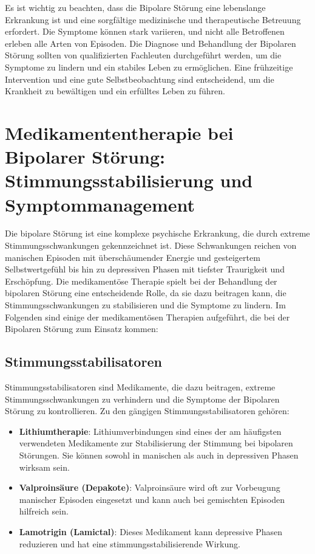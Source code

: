 Es ist wichtig zu beachten, dass die Bipolare Störung eine lebenslange Erkrankung ist und eine sorgfältige medizinische und therapeutische Betreuung erfordert. Die Symptome können stark variieren, und nicht alle Betroffenen erleben alle Arten von Episoden. Die Diagnose und Behandlung der Bipolaren Störung sollten von qualifizierten Fachleuten durchgeführt werden, um die Symptome zu lindern und ein stabiles Leben zu ermöglichen. Eine frühzeitige Intervention und eine gute Selbstbeobachtung sind entscheidend, um die Krankheit zu bewältigen und ein erfülltes Leben zu führen.
%
\section{Medikamententherapie bei Bipolarer Störung: Stimmungsstabilisierung und Symptommanagement}

Die bipolare Störung ist eine komplexe psychische Erkrankung, die durch extreme Stimmungsschwankungen gekennzeichnet ist. Diese Schwankungen reichen von manischen Episoden mit überschäumender Energie und gesteigertem Selbstwertgefühl bis hin zu depressiven Phasen mit tiefster Traurigkeit und Erschöpfung. Die medikamentöse Therapie spielt bei der Behandlung der bipolaren Störung eine entscheidende Rolle, da sie dazu beitragen kann, die Stimmungsschwankungen zu stabilisieren und die Symptome zu lindern. Im Folgenden sind einige der medikamentösen Therapien aufgeführt, die bei der Bipolaren Störung zum Einsatz kommen:

\subsection{Stimmungsstabilisatoren}

Stimmungsstabilisatoren sind Medikamente, die dazu beitragen, extreme Stimmungsschwankungen zu verhindern und die Symptome der Bipolaren Störung zu kontrollieren. Zu den gängigen Stimmungsstabilisatoren gehören:

\begin{itemize}
\item \textbf{Lithiumtherapie}: Lithiumverbindungen sind eines der am häufigsten verwendeten Medikamente zur Stabilisierung der Stimmung bei bipolaren Störungen. Sie können sowohl in manischen als auch in depressiven Phasen wirksam sein.

\item \textbf{Valproinsäure (Depakote)}: Valproinsäure wird oft zur Vorbeugung manischer Episoden eingesetzt und kann auch bei gemischten Episoden hilfreich sein.

\item \textbf{Lamotrigin (Lamictal)}: Dieses Medikament kann depressive Phasen reduzieren und hat eine stimmungsstabilisierende Wirkung.
\end{itemize}

